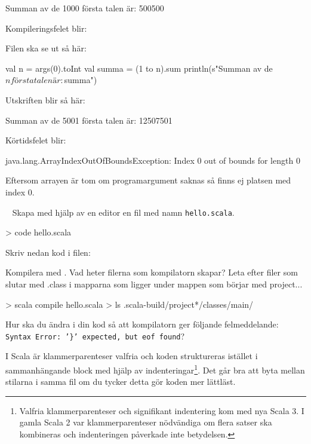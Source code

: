 \SOLUTION

\TaskSolved \what

\SubtaskSolved
\begin{REPL}
Summan av de 1000 första talen är: 500500
\end{REPL}

\SubtaskSolved  Kompileringsfelet blir: 

\SubtaskSolved  Filen ska se ut så här:
\begin{Code}
val n = args(0).toInt
val summa = (1 to n).sum
println(s"Summan av de $n första talen är: $summa")
\end{Code}

Utskriften blir så här:
\begin{REPL}
Summan av de 5001 första talen är: 12507501
\end{REPL}

\SubtaskSolved Körtidsfelet blir: 
\begin{REPLnonum}
java.lang.ArrayIndexOutOfBoundsException: Index 0 out of bounds for length 0
\end{REPLnonum}
Eftersom arrayen  är tom om programargument saknas så finns ej platsen med index $0$.

\QUESTEND




\QUESTBEGIN

\Task  \what~  Skapa med hjälp av en editor en fil med namn \texttt{hello.scala}.
\begin{REPLnonum}
> code hello.scala
\end{REPLnonum}
Skriv nedan kod i filen:



\Subtask Kompilera med . Vad heter filerna som kompilatorn skapar? Leta efter filer som slutar med .class i mapparna som ligger under mappen som börjar med project...
\begin{REPLnonum}
> scala compile hello.scala
> ls .scala-build/project*/classes/main/ 
\end{REPLnonum}

\Subtask Hur ska du ändra i din kod så att kompilatorn ger följande felmeddelande: \\
\texttt{Syntax Error: '\}' expected, but eof found}?

\Subtask I Scala är klammerparenteser valfria  och koden struktureras istället i sammanhängande block med hjälp av indenteringar\footnote{Valfria klammerparenteser och signifikant indentering kom med nya Scala 3. I gamla Scala 2 var klammerparenteser nödvändiga om flera satser ska kombineras och indenteringen påverkade inte betydelsen.}. Det går bra att byta mellan stilarna i samma fil om du tycker detta gör koden mer lättläst.

